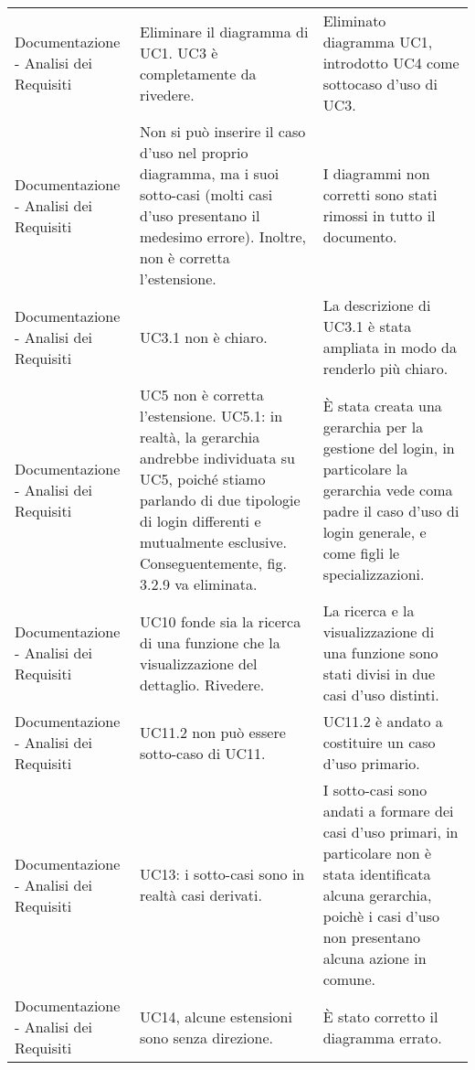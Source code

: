 \begin{longtable}{ 
				>{\centering}p{} 
				>{\centering}p{}
				>{\centering\arraybackslash}p{}}
				Documentazione - Analisi dei Requisiti
					&
				Eliminare il diagramma di UC1. UC3 è completamente da rivedere.
					&
				Eliminato diagramma UC1, introdotto UC4 come sottocaso d'uso di UC3.   
					\\
			
				Documentazione - Analisi dei Requisiti
					&
				Non si può inserire il caso d'uso nel proprio diagramma, ma i suoi sotto-casi (molti casi d'uso presentano il medesimo errore). Inoltre, non è corretta l'estensione.
					&
				I diagrammi non corretti sono stati rimossi in tutto il documento. 
					\\
			
				Documentazione - Analisi dei Requisiti
					&
				UC3.1 non è chiaro.
					&
				La descrizione di UC3.1 è stata ampliata in modo da renderlo più chiaro. 
					\\
			
				Documentazione - Analisi dei Requisiti
					&
				UC5 non è corretta l'estensione. UC5.1: in realtà, la gerarchia andrebbe individuata su UC5, poiché stiamo parlando di due tipologie di login differenti e mutualmente esclusive. Conseguentemente, fig. 3.2.9 va eliminata.
					&
				È stata creata una gerarchia per la gestione del login, in particolare la gerarchia vede coma padre il caso d'uso di login generale, e come figli le specializzazioni. 
					\\
			
				Documentazione - Analisi dei Requisiti
					&
				UC10 fonde sia la ricerca di una funzione che la visualizzazione del dettaglio. Rivedere.
					&
				La ricerca e la visualizzazione di una funzione sono stati divisi in due casi d'uso distinti. 
					\\
			
				Documentazione - Analisi dei Requisiti
					&
				UC11.2 non può essere sotto-caso di UC11.
					&
				UC11.2 è andato a costituire un caso d'uso primario. 
					\\
			
				Documentazione - Analisi dei Requisiti
					&
				UC13: i sotto-casi sono in realtà casi derivati.
					&
				I sotto-casi sono andati a formare dei casi d'uso primari, in particolare non è stata identificata alcuna gerarchia, poichè i casi d'uso non presentano alcuna azione in comune. 
					\\
							
				Documentazione - Analisi dei Requisiti
					&
				UC14, alcune estensioni sono senza direzione.
					&
				È stato corretto il diagramma errato. 
					\\
			

\end{longtable}
